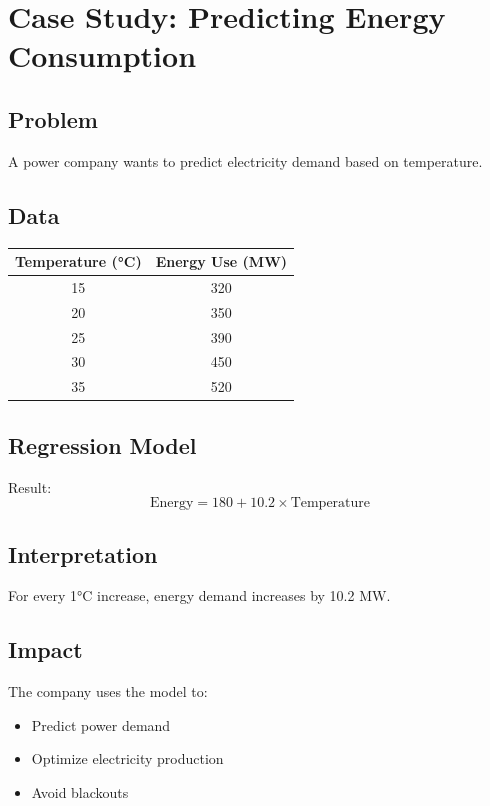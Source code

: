 \documentclass[12pt,a4paper]{article}
\begin{document}
	\section{Case Study: Predicting Energy Consumption}
	
	\subsection{Problem}
	A power company wants to predict electricity demand based on temperature.
	
	\subsection{Data}
	\begin{table}[h!]
		\centering
		\begin{tabular}{|c|c|}
			\hline
			\textbf{Temperature (°C)} & \textbf{Energy Use (MW)} \\
			\hline
			15 & 320 \\
			20 & 350 \\
			25 & 390 \\
			30 & 450 \\
			35 & 520 \\
			\hline
		\end{tabular}
	\end{table}
	
	\subsection{Regression Model}
	Result:
	\[
	\text{Energy} = 180 + 10.2 \times \text{Temperature}
	\]
	
	\subsection{Interpretation}
	For every 1°C increase, energy demand increases by 10.2 MW.
	
	\subsection{Impact}
	The company uses the model to:
	\begin{itemize}
		\item Predict power demand
		\item Optimize electricity production
		\item Avoid blackouts
	\end{itemize}
	
\end{document}
